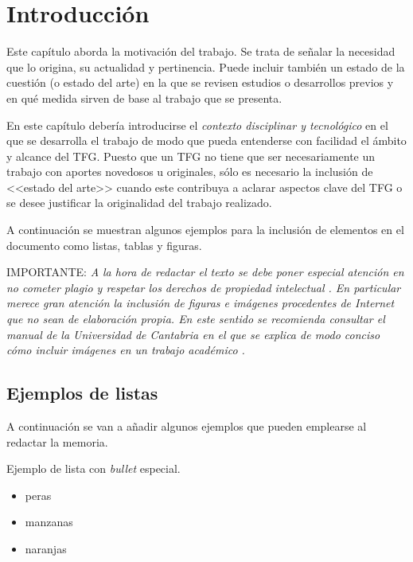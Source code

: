 \chapter{Introducción}
\label{cap:Introduccion}

Este capítulo aborda la motivación del trabajo. Se trata de señalar la necesidad que lo origina, su actualidad y pertinencia. Puede incluir también un estado de la cuestión (o estado del arte) en la que se revisen estudios o desarrollos previos y en qué medida sirven de base al trabajo que se presenta.

En este capítulo debería introducirse el \emph{contexto disciplinar y tecnológico} en el que se desarrolla el trabajo de modo que pueda entenderse con facilidad el ámbito y alcance del TFG. Puesto que un TFG no tiene que ser necesariamente un trabajo con aportes novedosos u originales, sólo es necesario la inclusión de <<estado del arte>> cuando este contribuya a aclarar aspectos clave del TFG o se desee justificar la originalidad del trabajo realizado.

A continuación se muestran algunos ejemplos para la inclusión de elementos en el documento como listas, tablas y figuras.

\noindent \textsc{IMPORTANTE}: \emph{A la hora de redactar el texto se debe poner especial atención en no cometer plagio y respetar los derechos de propiedad intelectual \cite{refer00,sidney00}. En particular merece gran atención la inclusión de figuras e imágenes procedentes de Internet que no sean de elaboración propia. En este sentido se recomienda consultar el manual de la Universidad de Cantabria en el que se explica de modo conciso cómo incluir imágenes en un trabajo académico %
.}

\section{Ejemplos de listas}
\label{sec:ejListas}
A continuación se van a añadir algunos ejemplos que pueden emplearse al redactar la memoria.

\noindent Ejemplo de lista con \emph{bullet} especial. 
\begin{itemize}
	\item[\ding{52}] peras
	\item manzanas
	\item naranjas
\end{itemize}


